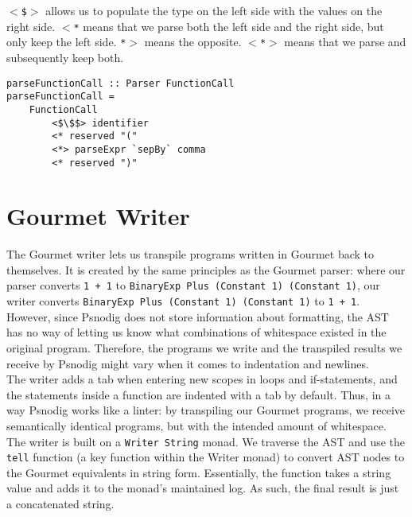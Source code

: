 \texttt{$<$\$$>$} allows us to populate the type on the left side with the values on the right side. \texttt{$<$*} means that we parse both the left side and the right side, but only keep the left side. \texttt{*$>$} means the opposite. \texttt{$<$*$>$} means that we parse and subsequently keep both. \\

\begin{lstlisting}[caption={Parsing Gourmet function calls.}, captionpos=b, label={Parsing Gourmet function calls.}]
parseFunctionCall :: Parser FunctionCall
parseFunctionCall =
    FunctionCall
        <$\$$> identifier
        <* reserved "("
        <*> parseExpr `sepBy` comma
        <* reserved ")"
\end{lstlisting}

\section{Gourmet Writer}

The Gourmet writer lets us transpile programs written in Gourmet back to themselves. It is created by the same principles as the Gourmet parser: where our parser converts \texttt{1 + 1} to \texttt{BinaryExp Plus (Constant 1) (Constant 1)}, our writer converts \texttt{BinaryExp Plus (Constant 1) (Constant 1)} to \texttt{1 + 1}. \\

However, since Psnodig does not store information about formatting, the AST has no way of letting us know what combinations of whitespace existed in the original program. Therefore, the programs we write and the transpiled results we receive by Psnodig might vary when it comes to indentation and newlines. \\

The writer adds a tab when entering new scopes in loops and if-statements, and the statements inside a function are indented with a tab by default. Thus, in a way Psnodig works like a linter: by transpiling our Gourmet programs, we receive semantically identical programs, but with the intended amount of whitespace. \\

The writer is built on a \texttt{Writer String} monad. We traverse the AST and use the \texttt{tell} function (a key function within the Writer monad) to convert AST nodes to the Gourmet equivalents in string form. Essentially, the function takes a string value and adds it to the monad's maintained log. As such, the final result is just a concatenated string.


